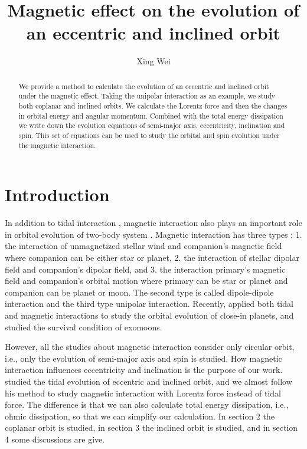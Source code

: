 \documentclass[twocolumn,linenumbers]{aastex631}
\begin{document}
\title{Magnetic effect on the evolution of an eccentric and inclined orbit}

\author[0000-0002-3641-6732]{Xing Wei}

\begin{abstract}
We provide a method to calculate the evolution of an eccentric and inclined orbit under the magnetic effect. Taking the unipolar interaction as an example, we study both coplanar and inclined orbits. We calculate the Lorentz force and then the changes in orbital energy and angular momentum. Combined with the total energy dissipation we write down the evolution equations of semi-major axis, eccentricity, inclination and spin. This set of equations can be used to study the orbital and spin evolution under the magnetic interaction.
\end{abstract}

\section{Introduction} \label{introduction}

In addition to tidal interaction \citep{goldreich1966, hut1981, ogilvie2014}, magnetic interaction also plays an important role in orbital evolution of two-body system \citep{goldreich1969, laine2008, laine2012, lai2012}. Magnetic interaction has three types \citep{zarka2007}: 1. the interaction of unmagnetized stellar wind and companion's magnetic field where companion can be either star or planet, 2. the interaction of stellar dipolar field and companion's dipolar field, and 3. the interaction primary's magnetic field and companion's orbital motion where primary can be star or planet and companion can be planet or moon. The second type is called dipole-dipole interaction and the third type unipolar interaction. Recently, \citet{strugarek2021} applied both tidal and magnetic interactions to study the orbital evolution of close-in planets, and \citet{wei2024} studied the survival condition of exomoons.

However, all the studies about magnetic interaction consider only circular orbit, i.e., only the evolution of semi-major axis and spin is studied. How magnetic interaction influences eccentricity and inclination is the purpose of our work. \citet{hut1981} studied the tidal evolution of eccentric and inclined orbit, and we almost follow his method to study magnetic interaction with Lorentz force instead of tidal force. The difference is that we can also calculate total energy dissipation, i.e., ohmic dissipation, so that we can simplify our calculation. In section 2 the coplanar orbit is studied, in section 3 the inclined orbit is studied, and in section 4 some discussions are give.
\end{document}
